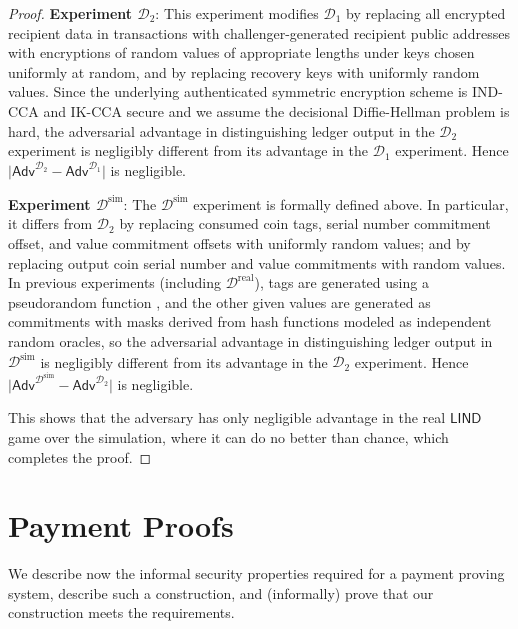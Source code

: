 \documentclass{llncs}
\newcommand{\func}[1]{\mathsf{#1}}
\begin{document}
\begin{proof}
\textbf{Experiment $\mathcal{D}_2$}: This experiment modifies $\mathcal{D}_{1}$ by replacing all encrypted recipient data in transactions with challenger-generated recipient public addresses with encryptions of random values of appropriate lengths under keys chosen uniformly at random, and by replacing recovery keys with uniformly random values.
Since the underlying authenticated symmetric encryption scheme is IND-CCA and IK-CCA secure and we assume the decisional Diffie-Hellman problem is hard, the adversarial advantage in distinguishing ledger output in the $\mathcal{D}_2$ experiment is negligibly different from its advantage in the $\mathcal{D}_{1}$ experiment.
Hence $\lvert \func{Adv}^{\mathcal{D}_2} - \func{Adv}^{\mathcal{D}_1} \rvert$ is negligible.

\textbf{Experiment $\mathcal{D}^{\text{sim}}$}: The $\mathcal{D}^{\text{sim}}$ experiment is formally defined above.
In particular, it differs from $\mathcal{D}_{2}$ by replacing consumed coin tags, serial number commitment offset, and value commitment offsets with uniformly random values; and by replacing output coin serial number and value commitments with random values.
In previous experiments (including $\mathcal{D}^{\text{real}}$), tags are generated using a pseudorandom function \cite{dodis}, and the other given values are generated as commitments with masks derived from hash functions modeled as independent random oracles, so the adversarial advantage in distinguishing ledger output in $\mathcal{D}^{\text{sim}}$ is negligibly different from its advantage in the $\mathcal{D}_2$ experiment.
Hence $\lvert \func{Adv}^{\mathcal{D}^{\text{sim}}} - \func{Adv}^{\mathcal{D}_2} \rvert$ is negligible.

This shows that the adversary has only negligible advantage in the real $\func{LIND}$ game over the simulation, where it can do no better than chance, which completes the proof.
\end{proof}


\section{Payment Proofs}
\label{app:payment}

We describe now the informal security properties required for a payment proving system, describe such a construction, and (informally) prove that our construction meets the requirements.
\end{document}
